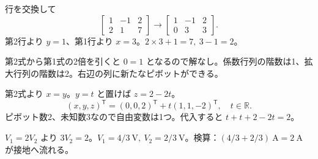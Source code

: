 \documentclass[11pt]{article}
\begin{document}

\problem[一意解]
\begin{ans}
行を交換して \[\left[\begin{array}{cc|c}1&-1&2\\2&1&7\end{array}\right]\to\left[\begin{array}{cc|c}1&-1&2\\0&3&3\end{array}\right].\] 第2行より $y=1$、第1行より $x=3$。$2\times3+1=7,\ 3-1=2$。
\end{ans}

\problem[解の存在]
\begin{ans}
第2式から第1式の2倍を引くと $0=1$ となるので解なし。係数行列の階数は1、拡大行列の階数は2。右辺の列に新たなピボットができる。
\end{ans}
\newpage

\problem[自由変数]
\begin{ans}
第2式より $x=y$。$y=t$ と置けば $z=2-2t$。\[(x,y,z)^{\mathsf T}=(0,0,2)^{\mathsf T}+t(1,1,-2)^{\mathsf T},\quad t\in\mathbb R.\] ピボット数2、未知数3なので自由変数は1つ。代入すると $t+t+2-2t=2$。
\end{ans}

\problem[節点電圧]
\begin{ans}
$V_1=2V_2$ より $3V_2=2$。$V_1=4/3\ \mathrm V,\ V_2=2/3\ \mathrm V$。検算：$(4/3+2/3)\ \mathrm A=2\ \mathrm A$ が接地へ流れる。
\end{ans}
\end{document}
